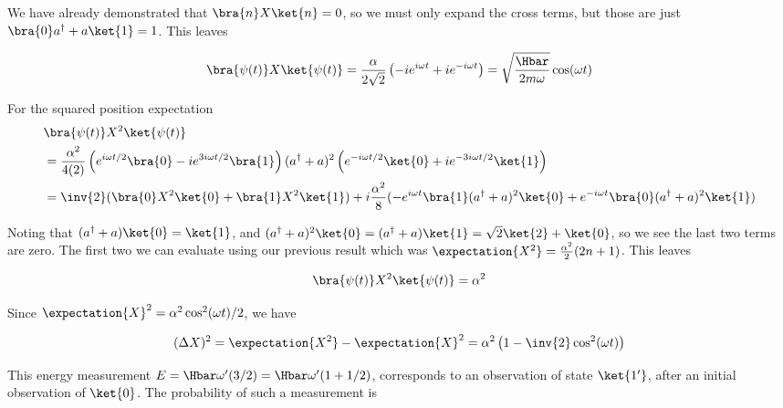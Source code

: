 {We have already demonstrated that \(\bra{n} X \ket{n} = 0\), so we must only expand the cross terms, but those are just \(\bra{0} a^\dagger + a \ket{1} = 1\).  This leaves

\begin{equation}\label{eqn:qmIexamPractice2008Dec:3:310}
\bra{\psi(t)} X \ket{\psi(t)}
=
\frac{\alpha}{2 \sqrt{2}}
\left( -i e^{i \omega t} + i e^{-i \omega t} \right)
=
\sqrt{\frac{\Hbar}{2 m \omega}} \cos(\omega t)
\end{equation}

For the squared position expectation
\begin{equation}\label{eqn:qmIexamPractice:770}
\begin{aligned}
&\bra{\psi(t)} X^2 \ket{\psi(t)} \\
&=
\frac{\alpha^2}{4 (2)}
\left(
e^{i \omega t/2 } \bra{0}
- i e^{ 3 i \omega t/2 } \bra{1}
\right)
(a^\dagger + a)^2
\left(
e^{-i \omega t/2 } \ket{0}
+ i e^{- 3 i \omega t/2 } \ket{1}
\right) \\
&=
\inv{2} ( \bra{0} X^2 \ket{0} + \bra{1} X^2 \ket{1} )
+ i \frac{\alpha^2 }{8} (
- e^{ i \omega t} \bra{1} (a^\dagger + a)^2 \ket{0}
+ e^{ -i \omega t} \bra{0} (a^\dagger + a)^2 \ket{1}
)
\end{aligned}
\end{equation}

Noting that \((a^\dagger + a) \ket{0} = \ket{1}\), and \((a^\dagger + a)^2 \ket{0} = (a^\dagger + a)\ket{1} = \sqrt{2} \ket{2} + \ket{0}\), so we see the last two terms are zero.  The first two we can evaluate using our previous result  which was \(\expectation{X^2} = \frac{\alpha^2}{2} (2n + 1)\).  This leaves

\begin{equation}\label{eqn:qmIexamPractice2008Dec:3:330}
\bra{\psi(t)} X^2 \ket{\psi(t)} = \alpha^2
\end{equation}

Since \(\expectation{X}^2 = \alpha^2 \cos^2(\omega t)/2\), we have

\begin{equation}\label{eqn:qmIexamPractice2008Dec:3:340}
(\Delta X)^2 = \expectation{X^2} - \expectation{X}^2 = \alpha^2 \left(1 - \inv{2} \cos^2(\omega t) \right)
\end{equation}


This energy measurement \(E = \Hbar \omega' (3/2) = \Hbar \omega' (1 + 1/2)\), corresponds to an observation of state \(\ket{1'}\), after an initial observation of \(\ket{0}\).  The probability of such a measurement is

}
